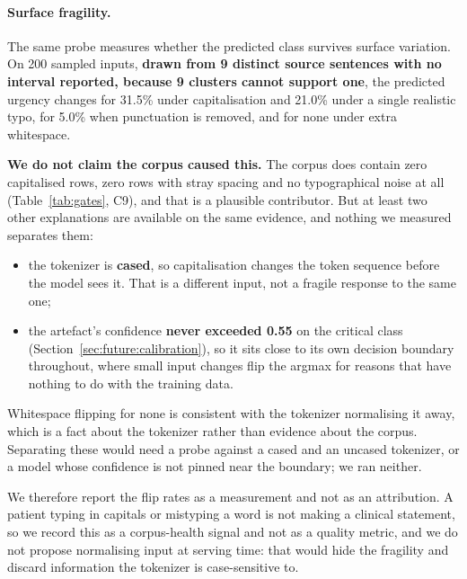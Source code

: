 \paragraph{Surface fragility.} The same probe measures whether the predicted
class survives surface variation. On 200 sampled inputs, \textbf{drawn from 9
distinct source sentences with no interval reported, because 9 clusters cannot
support one}, the predicted urgency changes for 31.5\% under capitalisation and
21.0\% under a single realistic typo, for 5.0\% when punctuation is removed, and
for none under extra whitespace.

\textbf{We do not claim the corpus caused this.} The corpus does contain zero
capitalised rows, zero rows with stray spacing and no typographical noise at all
(Table~\ref{tab:gates}, C9), and that is a plausible contributor. But at least
two other explanations are available on the same evidence, and nothing we
measured separates them:

\begin{itemize}
\item the tokenizer is \textbf{cased}, so capitalisation changes the token
  sequence before the model sees it. That is a different input, not a fragile
  response to the same one;
\item the artefact's confidence \textbf{never exceeded 0.55} on the critical
  class (Section~\ref{sec:future:calibration}), so it sits close to its own
  decision boundary throughout, where small input changes flip the argmax for
  reasons that have nothing to do with the training data.
\end{itemize}

Whitespace flipping for none is consistent with the tokenizer normalising it
away, which is a fact about the tokenizer rather than evidence about the corpus.
Separating these would need a probe against a cased and an uncased tokenizer, or
a model whose confidence is not pinned near the boundary; we ran neither.

We therefore report the flip rates as a measurement and not as an attribution. A
patient typing in capitals or mistyping a word is not making a clinical
statement, so we record this as a corpus-health signal and not as a quality
metric, and we do not propose normalising input at serving time: that would hide
the fragility and discard information the tokenizer is case-sensitive to.


